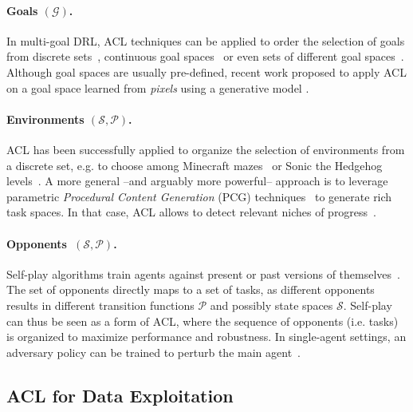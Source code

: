 \documentclass{article}
\begin{document}

\paragraph{Goals $(\mathcal{G})$.}In multi-goal DRL, ACL techniques can be applied to order the selection of goals from discrete sets~\cite{le2}, continuous goal spaces~\cite{asymetricSP,goalgan,skewfit,settersolver} or even sets of different goal spaces~\cite{CGM,curious}. Although goal spaces are usually pre-defined, recent work proposed to apply ACL on a goal space learned from \textit{pixels} using a generative model \cite{skewfit}. 

\paragraph{Environments $(\mathcal{S}, \mathcal{P})$.}ACL has been successfully applied to organize the selection of environments from a discrete set, e.g. to choose among Minecraft mazes~\cite{tscl} or Sonic the Hedgehog levels~\cite{tscllike}. A more general --and arguably more powerful-- approach is to leverage parametric \textit{Procedural Content Generation} (PCG) techniques~\cite{risiPCG} to generate rich task spaces. In that case, ACL allows to detect relevant niches of progress~\cite{OpenAI2019SolvingRC,portelas2019,ADRmila}.

\paragraph{Opponents~$(\mathcal{S}, \mathcal{P})$.}Self-play algorithms train agents against present or past versions of themselves~\cite{alpha-go-zero,openaiSumos,vinyals2019grandmaster,Baker2019HidenSeek}. The set of opponents directly maps to a set of tasks, as different opponents results in different transition functions $\mathcal{P}$ and possibly state spaces $\mathcal{S}$. Self-play can thus be seen as a form of ACL, where the sequence of opponents (i.e. tasks) is organized to maximize performance and robustness. In single-agent settings, an adversary policy can be trained to perturb the main agent~\cite{rarl}.

\subsection{ACL for Data Exploitation}
\label{sec:lever_data_exploitation}
\end{document}
